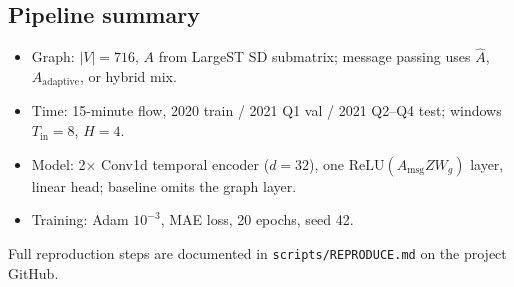\subsection{Pipeline summary}

\begin{itemize}
  \item Graph: $|V|=716$, $A$ from LargeST SD submatrix; message passing uses $\hat{A}$, $A_{\mathrm{adaptive}}$, or hybrid mix.
  \item Time: 15-minute flow, 2020 train / 2021 Q1 val / 2021 Q2--Q4 test; windows $T_{\mathrm{in}}=8$, $H=4$.
  \item Model: 2$\times$ Conv1d temporal encoder ($d=32$), one $\mathrm{ReLU}(A_{\mathrm{msg}} Z W_g)$ layer, linear head; baseline omits the graph layer.
  \item Training: Adam $10^{-3}$, MAE loss, 20 epochs, seed 42.
\end{itemize}

Full reproduction steps are documented in \texttt{scripts/REPRODUCE.md} on the project GitHub.